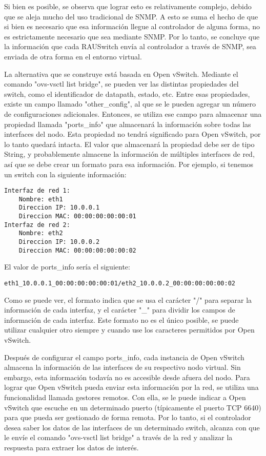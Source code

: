 Si bien es posible, se observa que lograr esto es relativamente complejo, debido que se aleja mucho del uso tradicional de SNMP. A esto se suma el hecho de que si bien es necesario que esa información llegue al controlador de alguna forma, no es estrictamente necesario que sea mediante SNMP. Por lo tanto, se concluye que la información que cada RAUSwitch envía al controlador a través de SNMP, sea enviada de otra forma en el entorno virtual.

La alternativa que se construye está basada en Open vSwitch. Mediante el comando "ovs-vsctl list bridge", se pueden ver las distintas propiedades del switch, como el identificador de datapath, estado, etc. Entre esas propiedades, existe un campo llamado "other\_config", al que se le pueden agregar un número de configuraciones adicionales. Entonces, se utiliza ese campo para almacenar una propiedad llamada "ports\_info" que almacenará la información sobre todas las interfaces del nodo. Esta propiedad no tendrá significado para Open vSwitch, por lo tanto quedará intacta. El valor que almacenará la propiedad debe ser de tipo String, y probablemente almacene la información de múltiples interfaces de red, así que se debe crear un formato para esa información. Por ejemplo, si tenemos un switch con la siguiente información:
\begin{lstlisting}
Interfaz de red 1:
	Nombre: eth1
	Direccion IP: 10.0.0.1
	Direccion MAC: 00:00:00:00:00:01
Interfaz de red 2:
	Nombre: eth2
	Direccion IP: 10.0.0.2
	Direccion MAC: 00:00:00:00:00:02
\end{lstlisting}
El valor de ports\_info sería el siguiente:
\begin{lstlisting}
eth1_10.0.0.1_00:00:00:00:00:01/eth2_10.0.0.2_00:00:00:00:00:02
\end{lstlisting}

Como se puede ver, el formato indica que se usa el carácter "/" para separar la información de cada interfaz, y el carácter "\_" para dividir los campos de información de cada interfaz. Este formato no es el único posible, se puede utilizar cualquier otro siempre y cuando use los caracteres permitidos por Open vSwitch.

Después de configurar el campo ports\_info, cada instancia de Open vSwitch almacena la información de las interfaces de su respectivo nodo virtual. Sin embargo, esta información todavía no es accesible desde afuera del nodo. Para lograr que Open vSwitch pueda enviar esta información por la red, se utiliza una funcionalidad llamada gestores remotos. Con ella, se le puede indicar a Open vSwitch que escuche en un determinado puerto (típicamente el puerto TCP 6640) para que pueda ser gestionado de forma remota. Por lo tanto, si el controlador desea saber los datos de las interfaces de un determinado switch, alcanza con que le envíe el comando "ovs-vsctl list bridge" a través de la red y analizar la respuesta para extraer los datos de interés.

